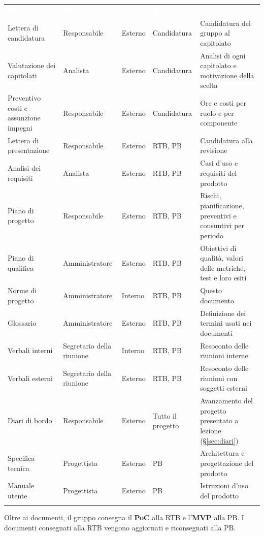 \documentclass[12pt,a4paper]{article}
\newcommand{\thc}[1]{\textcolor{white}{\textbf{#1}}}
\newcommand{\rl}{\arrayrulecolor{bfline}\hline}
\begin{document}
\begin{center}
\begin{tabularx}{\linewidth}{>{\hsize=1.05\hsize\raggedright\arraybackslash}X>{\hsize=0.65\hsize\raggedright\arraybackslash}X>{\hsize=0.5\hsize\raggedright\arraybackslash}X>{\hsize=0.6\hsize\raggedright\arraybackslash}X>{\hsize=1.2\hsize\raggedright\arraybackslash}X}
\rowcolor{bfblue}\thc{Documento} & \thc{Redattore} & \thc{Uso} & \thc{Revisione} & \thc{Contenuto} \\
Lettera di candidatura & Responsabile & Esterno & Candidatura & Candidatura del gruppo al capitolato \\ \rl
Valutazione dei capitolati & Analista & Esterno & Candidatura & Analisi di ogni capitolato e motivazione della scelta \\ \rl
Preventivo costi e assunzione impegni & Responsabile & Esterno & Candidatura & Ore e costi per ruolo e per componente \\ \rl
Lettera di presentazione & Responsabile & Esterno & RTB, PB & Candidatura alla revisione \\ \rl
Analisi dei requisiti & Analista & Esterno & RTB, PB & Casi d'uso e requisiti del prodotto \\ \rl
Piano di progetto & Responsabile & Esterno & RTB, PB & Rischi, pianificazione, preventivi e consuntivi per periodo \\ \rl
Piano di qualifica & Amministratore & Esterno & RTB, PB & Obiettivi di qualità, valori delle metriche, test e loro esiti \\ \rl
Norme di progetto & Amministratore & Interno & RTB, PB & Questo documento \\ \rl
Glossario & Amministratore & Esterno & RTB, PB & Definizione dei termini usati nei documenti \\ \rl
Verbali interni & Segretario della riunione & Interno & RTB, PB & Resoconto delle riunioni interne \\ \rl
Verbali esterni & Segretario della riunione & Esterno & RTB, PB & Resoconto delle riunioni con soggetti esterni \\ \rl
Diari di bordo & Responsabile & Esterno & Tutto il progetto & Avanzamento del progetto presentato a lezione (§\ref{sec:diari}) \\ \rl
Specifica tecnica & Progettista & Esterno & PB & Architettura e progettazione del prodotto \\ \rl
Manuale utente & Progettista & Esterno & PB & Istruzioni d'uso del prodotto \\ \rl
\end{tabularx}
\end{center}
Oltre ai documenti, il gruppo consegna il \textbf{PoC} alla RTB e l'\textbf{MVP} alla PB. I documenti consegnati alla RTB vengono aggiornati e riconsegnati alla PB.
\end{document}
